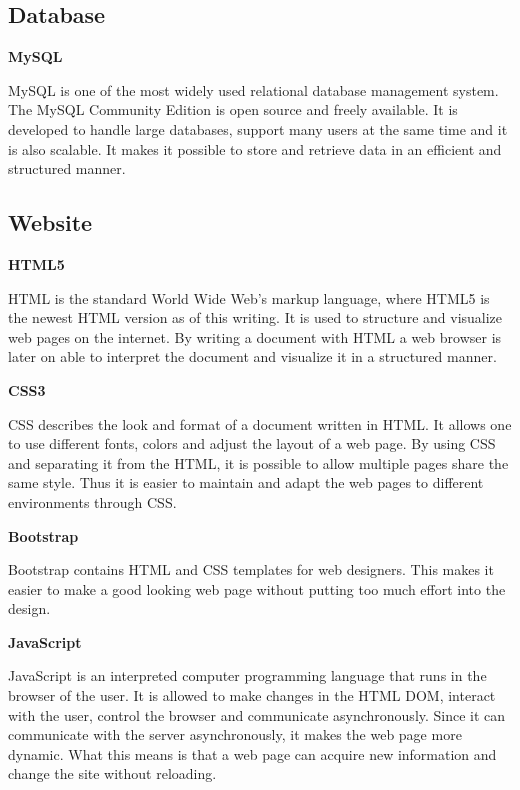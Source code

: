 \subsection{Database}

\textbf{MySQL} \cite{MySQL}

MySQL is one of the most widely used relational database management system.
The MySQL Community Edition is open source and freely available.
It is developed to handle large databases, support many users at the same time and it is also scalable.
It makes it possible to store and retrieve data in an efficient and structured manner.

\subsection{Website}

\textbf{HTML5} \cite{HTML5}

HTML is the standard World Wide Web's markup language, where HTML5 is the newest HTML version as of this writing.
It is used to structure and visualize web pages on the internet.
By writing a document with HTML a web browser is later on able to interpret the document and visualize it in a structured manner.

\textbf{CSS3} \cite{CSS3}

CSS describes the look and format of a document written in HTML.
It allows one to use different fonts, colors and adjust the layout of a web page.
By using CSS and separating it from the HTML, it is possible to allow multiple pages share the same style.
Thus it is easier to maintain and adapt the web pages to different environments through CSS.

\textbf{Bootstrap} \cite{Bootstrap}

Bootstrap contains HTML and CSS templates for web designers.
This makes it easier to make a good looking web page without putting too much effort into the design.

\textbf{JavaScript} \cite{JavaScript}

JavaScript is an interpreted computer programming language that runs in the browser of the user.
It is allowed to make changes in the HTML DOM, interact with the user, control the browser and communicate asynchronously.
Since it can communicate with the server asynchronously, it makes the web page more dynamic.
What this means is that a web page can acquire new information and change the site without reloading.

